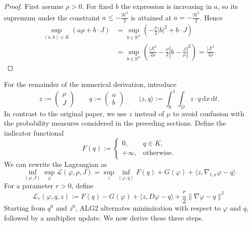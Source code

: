 \begin{proof}
	First assume $\rho>0$. For fixed $b$ the expression is increasing in $a$, so its supremum under the constraint $a\leq-\frac{|b|^2}{2}$ is attained at $a = -\frac{|b|^2}{2}$. Hence
	\begin{align*}
		\sup_{(a,b)\in K}(a\rho + b\cdot J) &= \sup_{b\in \mathbb{R}^n}\left(-\frac{\rho}{2}|b|^2 + b\cdot J \right)\\
											&=\sup_{b\in \mathbb{R}^n}\left(\frac{|J|^2}{2\rho}-\frac{\rho}{2}\left|b-\frac J\rho\right|^2\right) = \frac{|J|^2}{2\rho}.
	\end{align*}
\end{proof}
For the remainder of the numerical derivation, introduce
$$
z:=\begin{pmatrix}
\rho\\J
\end{pmatrix}\qquad q:= \begin{pmatrix}
a\\b
\end{pmatrix}\qquad \langle z,q\rangle := \int_0^1\int_\Omega z\cdot q\,\mathrm dx\,\mathrm dt.
$$
In contrast to the original paper, we use $z$ instead of $\mu$ to avoid confusion with the probability measures considered in the preceding sections. Define the indicator functional
$$
F(q) := \begin{cases} 0,&q\in K,\\
	+\infty,&\text{otherwise}.
\end{cases}
$$
We can rewrite the Lagrangian as %
$$
\inf_{(\rho,J)}\sup_\varphi \mathcal{L}(\varphi,\rho,J) = \sup_z\inf_{(\varphi,q)} F(q) + G(\varphi) + \langle z,\nabla_{t,x}\varphi-q\rangle
$$
For a parameter $r>0$, define
\begin{equation*}
	\label{eq:alg2}
	\mathcal{L}_r(\varphi,q,z) := F(q)-G(\varphi) + \langle z,D\varphi - q\rangle + \frac r2\|\nabla\varphi - q\|^2
\end{equation*}
Starting from $q^0$ and $z^0$, ALG2 alternates minimization with respect to $\varphi$ and $q$, followed by a multiplier update. We now derive these three steps.
